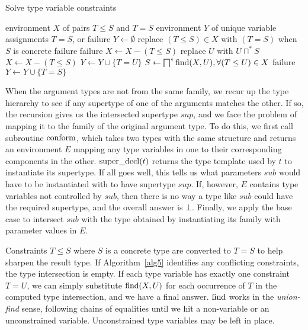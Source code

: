 \begin{algorithm}
\caption{Solve type variable constraints}
\label{alg5}
\begin{algorithmic}
\REQUIRE environment $X$ of pairs $T\leq S$ and $T=S$
\ENSURE environment $Y$ of unique variable assignments $T=S$, or failure
\STATE $Y \leftarrow \emptyset$
\STATE replace $(T\leq S) \in X$ with $(T=S)$ when $S$ is concrete
  \RETURN failure
 \ENDIF
\ENDFOR
{}
   \RETURN failure
  \ELSE
   \STATE $X \leftarrow X - (T\leq S)$
  \ENDIF
  \STATE replace $U$ with $U\sqcap^{*}S$
  \STATE $X \leftarrow X - (T\leq S)$
 \ENDIF
\ENDFOR
{}
  \STATE $Y \leftarrow Y \cup \{T=U\}$
 \ELSE
  \STATE $S \leftarrow \bigsqcap^{*}_{} \operatorname{find}(X,U), \forall (T\leq U) \in X$
   \RETURN failure
  \ENDIF
  \STATE $Y \leftarrow Y \cup \{T=S\}$
 \ENDIF
\ENDFOR
\end{algorithmic}
\end{algorithm}

When the argument types are not from the same family, we recur up the
type hierarchy to see if any supertype of one of the arguments matches
the other. If so, the recursion gives us the intersected supertype $sup$,
and we face the problem of mapping it to the family of the original argument
type. To do this, we first call subroutine $\operatorname{conform}$, which takes two types
with the same structure and returns an environment $E$ mapping any
type variables in one to their corresponding components in the other.
$\operatorname{super\_decl}(t)$ returns the type template used by $t$ to instantiate its
supertype. If all goes well, this tells us what parameters $sub$ would
have to be instantiated with to have supertype $sup$. If, however, $E$
contains type variables not controlled by $sub$, then there is no way
a type like $sub$ could have the required supertype, and the overall answer
is $\bot$.
Finally, we apply the base case to intersect $sub$ with the type obtained
by instantiating its family with parameter values in $E$.

Constraints $T\leq S$ where $S$ is a concrete type are converted to
$T=S$ to help sharpen the result type.
If Algorithm~\ref{alg5} identifies any conflicting constraints, the
type intersection is empty. If each type variable has exactly one
constraint $T=U$, we can simply substitute $\operatorname{find}(X,U)$ for each occurrence
of $T$ in the computed type intersection, and we have a final answer.
$\operatorname{find}$ works in the \emph{union-find} sense, following chains of equalities
until we hit a non-variable or an unconstrained variable. Unconstrained
type variables may be left in place.

